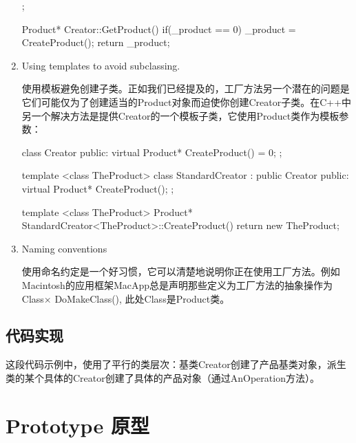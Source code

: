 \begin{enumerate}
\begin{schemedisplay}
{};

Product* Creator::GetProduct(){
	if(_product == 0){
		_product = CreateProduct();
	}
	return _product;
}
\end{schemedisplay}

	\item Using templates to avoid subclassing.

	使用模板避免创建子类。正如我们已经提及的，工厂方法另一个潜在的问题是它们可能仅为了创建适当的Product对象而迫使你创建Creator子类。在C++中另一个解决方法是提供Creator的一个模板子类，它使用Product类作为模板参数：

\begin{schemedisplay}
class Creator{
	public:
		virtual Product* CreateProduct() = 0;
};

template <class TheProduct> class StandardCreator : public Creator{
	public:
		virtual Product* CreateProduct();
};

template <class TheProduct>
Product* StandardCreator<TheProduct>::CreateProduct(){
	return new TheProduct;
}
\end{schemedisplay}

	\item Naming conventions

	使用命名约定是一个好习惯，它可以清楚地说明你正在使用工厂方法。例如Macintosh的应用框架MacApp总是声明那些定义为工厂方法的抽象操作为Class× DoMakeClass(), 此处Class是Product类。
	
\end{enumerate}

\subsection{代码实现}

这段代码示例中，使用了平行的类层次：基类Creator创建了产品基类对象，派生类的某个具体的Creator创建了具体的产品对象（通过AnOperation方法）。



\section{Prototype 原型}

